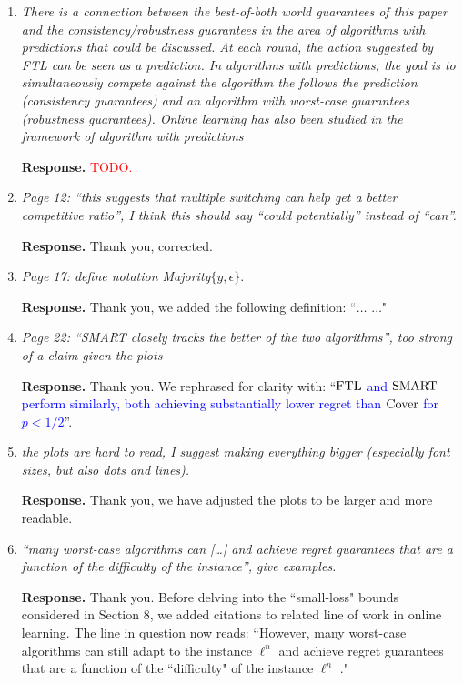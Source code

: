 \documentclass[11pt]{article}
\begin{document}
\begin{enumerate}
    \item \emph{There is a connection between the best-of-both world guarantees of this paper and the consistency/robustness guarantees in the area of algorithms with predictions that could be discussed. At each round, the action suggested by FTL can be seen as a prediction. In algorithms with predictions, the goal is to simultaneously compete against the algorithm the follows the prediction (consistency guarantees) and an algorithm with worst-case guarantees (robustness guarantees). Online learning has also been studied in the framework of algorithm with predictions}

    {\bf Response.} \textcolor{red}{TODO.}

    \item \emph{Page 12: “this suggests that multiple switching can help get a better competitive ratio”, I think this should say “could potentially” instead of “can”.}

    {\bf Response.} Thank you, corrected. 

    \item \emph{Page 17: define notation Majority$\{y, \epsilon\}$}.

    {\bf Response.} Thank you, we added the following definition: ``$\dotsc$  $\dotsc$"

    \item \emph{Page 22: “SMART closely tracks the better of the two algorithms”, too strong of a claim given the plots} 

    {\bf Response.} Thank you. We rephrased for clarity with: ``\textcolor{blue}{$\text{FTL}$ and $\text{SMART}$ perform similarly, both achieving substantially lower regret than $\text{Cover}$ for $p<1/2$}''.

    \item \emph{the plots are hard to read, I suggest making everything bigger (especially font sizes, but also dots and lines).}

    {\bf Response.} Thank you, we have adjusted the plots to be larger and more readable. 


    \item \emph{“many worst-case algorithms can […] and achieve regret guarantees that are a function of the difficulty of the instance”, give examples.}

    {\bf Response.} Thank you. Before delving into the ``small-loss" bounds considered in Section 8, we added citations to related line of work in online learning. The line in question now reads: 
    ``However, many worst-case algorithms can still adapt to the instance $\ell^n$ and achieve regret guarantees that are a function of the ``difficulty" of the instance $\ell^n$ ."


\end{enumerate}
\end{document}

